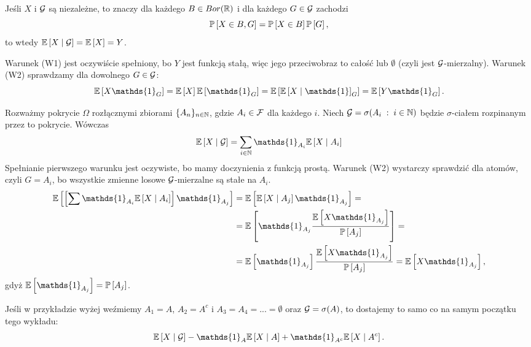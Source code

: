 \begin{example}
\item Jeśli $X$ i $\mathcal{G}$ są niezależne, to znaczy dla każdego $B\in Bor(\operatorname{\mathbb{R}})$ i dla każdego $G\in\mathcal{G}$ zachodzi
  $$\prob{X\in B, G}=\prob{X\in B}\prob{G},$$
  to wtedy $\expected{X}{\set{G}}=\expected{X}=Y$.

  Warunek (W1) jest oczywiście spełniony, bo $Y$ jest funkcją stałą, więc jego przeciwobraz to całość lub $\emptyset$ (czyli jest $\mathcal{G}$-mierzalny). Warunek (W2) sprawdzamy dla dowolnego $G\in\mathcal{G}$:
  $$\expected{X\mathds{1}_G}=\expected{X}\expected{\mathds{1}_G}=\expected{\expected{X}\mathds{1}_G}=\expected{Y\mathds{1}_G}.$$

\item Rozważmy pokrycie $\Omega$ rozłącznymi zbiorami $\{A_n\}_{n\in\operatorname{\mathbb{N}}}$, gdzie $A_i\in\mathcal{F}$ dla każdego $i$. Niech $\mathcal{G}=\sigma(A_i\;:\;i\in\operatorname{\mathbb{N}})$ będzie $\sigma$-ciałem rozpinanym przez to pokrycie. Wówczas
  $$\expected{X}{\set{G}}=\sum_{i\in\N}\mathds{1}_{A_i}\expected{X}{A_i}$$
  Spełnianie pierwszego warunku jest oczywiste, bo mamy doczynienia z funkcją prostą. Warunek (W2) wystarczy sprawdzić dla atomów, czyli $G=A_i$, bo wszystkie zmienne losowe $\mathcal{G}$-mierzalne są stałe na $A_i$.
  \begin{align*}
    \expected{\left[\sum\mathds{1}_{A_i}\expected{X}{A_i}\right]\mathds{1}_{A_j}}&=\expected{\expected{X}{A_j}\mathds{1}_{A_j}}=\\
                                                                                 &=\expected{\mathds{1}_{A_j}\frac{\expected{X\mathds{1}_{A_j}}}{\prob{A_j}}}=\\
                                                                                 &=\expected{\mathds{1}_{A_j}}\frac{\expected{X\mathds{1}_{A_j}}}{\prob{A_j}}=\expected{X\mathds{1}_{A_j}},
  \end{align*}
  gdyż $\expected{\mathds{1}_{A_j}}=\prob{A_j}$.
\item Jeśli w przykładzie wyżej weźmiemy $A_1=A$, $A_2=A^c$ i $A_3=A_4=...=\emptyset$ oraz $\mathcal{G}=\sigma(A)$, to dostajemy to samo co na samym początku tego wykładu:
  $$\expected{X}{\set{G}}-\mathds{1}_A\expected{X}{A}+\mathds{1}_{A^c}\expected{X}{A^c}.$$
\end{example}
